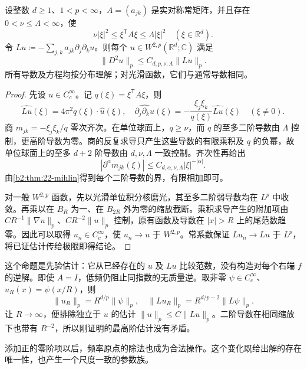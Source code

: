 \begin{proposition}[常系数椭圆导数估计]\label{b2:prop:22-elliptic-estimate}
设整数 \(d\geq1\)、\(1<p<\infty\)，\(A=(a_{jk})\) 是实对称常矩阵，并且存在 \(0<\nu\leq\Lambda<\infty\)，使
\[
 \nu|\xi|^2\leq\xi^{\mathsf T}A\xi\leq\Lambda|\xi|^2
 \quad(\xi\in\mathbb R^d).
\]
令 \(Lu\coloneqq-\sum_{j,k}a_{jk}\partial_j\partial_ku\)。则每个
\(u\in W^{2,p}(\mathbb R^d;\mathbb C)\) 满足
\[
 \|D^2u\|_p\leq C_{d,p,\nu,\Lambda}\|Lu\|_p.
\]
所有导数及方程均按分布理解；对光滑函数，它们与通常导数相同。
\end{proposition}
\begin{proof}
先设 \(u\in C_c^\infty\)。记 \(q(\xi)=\xi^{\mathsf T}A\xi\)，则
\[
 \widehat{Lu}(\xi)=4\pi^2q(\xi)\cdot\widehat u(\xi),\quad
 \widehat{\partial_j\partial_ku}(\xi)
 =-\frac{\xi_j\xi_k}{q(\xi)}\widehat{Lu}(\xi)
 \quad(\xi\ne0).
\]
商 \(m_{jk}=-\xi_j\xi_k/q\) 零次齐次。在单位球面上，\(q\geq\nu\)，而 \(q\) 的至多二阶导数由 \(\Lambda\) 控制，更高阶导数为零。商的反复求导只产生这些导数的有限乘积及 \(q\) 的负幂，故单位球面上的至多 \(d+2\) 阶导数由 \(d,\nu,\Lambda\) 一致控制。齐次性再给出
\[
 |\partial^\alpha m_{jk}(\xi)|
 \leq C_{d,\alpha,\nu,\Lambda}|\xi|^{-|\alpha|}.
\]
由\cref{b2:thm:22-mihlin}得到每个二阶导数的界，有限相加即可。

对一般 \(W^{2,p}\) 函数，先以光滑单位积分核磨光，其至多二阶弱导数均在 \(L^p\) 中收敛。再乘以在 \(B_R\) 为一、在 \(B_{2R}\) 外为零的缩放截断。乘积求导产生的附加项由
\(CR^{-1}\|\nabla u\|_p\)、\(CR^{-2}\|u\|_p\) 控制，原有函数及导数在 \(|x|>R\) 上的尾范数趋零。因此可以取得 \(u_n\in C_c^\infty\)，使 \(u_n\to u\) 于 \(W^{2,p}\)。常系数保证 \(Lu_n\to Lu\) 于 \(L^p\)，将已证估计传给极限即得结论。
\end{proof}
这个命题是先验估计：它从已经存在的 \(u\) 及 \(Lu\) 比较范数，没有构造对每个右端 \(f\) 的逆解。即使 \(A=I\)，低频仍阻止同指数的无质量逆。取非零 \(\psi\in C_c^\infty\)、\(u_R(x)=\psi(x/R)\)，则
\[
 \|u_R\|_p=R^{d/p}\|\psi\|_p,\quad
 \|Lu_R\|_p=R^{d/p-2}\|L\psi\|_p.
\]
让 \(R\to\infty\)，便排除独立于 \(u\) 的估计 \(\|u\|_p\leq C\|Lu\|_p\)。二阶导数在相同缩放下也带有 \(R^{-2}\)，所以刚证明的最高阶估计没有矛盾。

\ProseParagraphBreak

添加正的零阶项以后，频率原点的除法也成为合法操作。这个变化既给出解的存在唯一性，也产生一个尺度一致的参数族。

